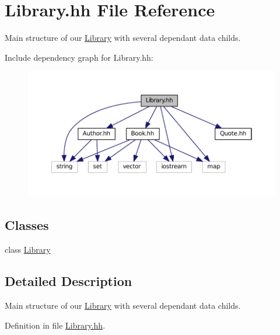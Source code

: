 \hypertarget{_library_8hh}{\section{Library.\+hh File Reference}
\label{_library_8hh}
}


Main structure of our \hyperlink{class_library}{Library} with several dependant data childs.  


Include dependency graph for Library.\+hh\+:
\nopagebreak
\begin{figure}[H]
\begin{center}
\leavevmode
\includegraphics[width=350pt]{_library_8hh__incl}
\end{center}
\end{figure}
\subsection*{Classes}
\begin{DoxyCompactItemize}
\item 
class \hyperlink{class_library}{Library}
\end{DoxyCompactItemize}


\subsection{Detailed Description}
Main structure of our \hyperlink{class_library}{Library} with several dependant data childs. 



Definition in file \hyperlink{_library_8hh_source}{Library.\+hh}.

